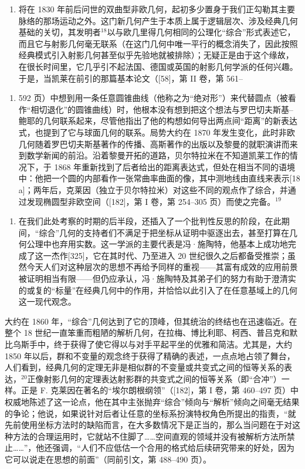 \begin{enumerate}
\item
  将在 1830 年前后问世的双曲型非欧几何，起初多少置身于我们正勾勒其主要脉络的那场运动之外。这门新几何产生于本质上属于逻辑层次、涉及经典几何基础的关切，其发明者\(^{18}\)以与欧几里得几何相同的公理化“综合”形式表述它，而且它与射影几何毫无联系（在这门几何中唯一平行的概念消失了，因此按照经典模式引入射影几何甚至似乎先验地就被排除）；无疑正是由于这个缘故，在很长时间里，它几乎引不起法国、德国或英国的射影几何学派的任何兴趣。于是，当凯莱在前引的那篇基本论文（{[}58{]}，第 II 卷，第 561–
\end{enumerate}

\begin{enumerate}
\def\labelenumi{\arabic{enumi})}
\setcounter{enumi}{591}
\tightlist
\item
  592 页）中想到用一条任意圆锥曲线（他称之为“绝对形”）来代替圆点（被看作“相切退化”的圆锥曲线）时，他根本没有想到把这个想法与罗巴切夫斯基–鲍耶的几何联系起来，尽管他指出了他的构想如何导出两点间“距离”的新表达式，也提到了它与球面几何的联系。局势大约在 1870 年发生变化，此时非欧几何随着罗巴切夫斯基著作的传播、高斯著作的出版以及黎曼的就职演讲而来到数学新闻的前沿。沿着黎曼开拓的道路，贝尔特拉米在不知道凯莱工作的情况下，于 1868 年重新找到了后者给出的距离表达式，但处在相当不同的语境中：他把一个圆的内部看作一张常曲率曲面的像，其中测地线由直线来表示{[}18 a{]}；两年后，克莱因（独立于贝尔特拉米）对这些不同的观点作了综合，并通过发现椭圆型非欧空间（{[}182{]}，第 I 卷，第 254–305 页）而使之完备。\(^{19}\)
\end{enumerate}

\begin{enumerate}
\def\labelenumi{\Alph{enumi})}
\setcounter{enumi}{6}
\tightlist
\item
  在我们此处考察的时期的后半段，还插入了一个批判性反思的阶段，在此期间，“综合”几何的支持者们不满足于把坐标从证明中驱逐出去，甚至打算在几何公理中也弃用实数。这一学派的主要代表是冯·施陶特，他基本上成功地完成了这一杰作{[}325{]}，它在其时代、乃至进入 20 世纪很久之后都备受推崇；虽然今天人们对这种层次的思想不再给予同样的重视——其富有成效的应用前景被证明相当有限——但仍应承认，冯·施陶特及其弟子们的努力有助于澄清实的或复的“标量”在经典几何中的作用，并恰恰以此引入了在任意基域上的几何这一现代观念。
\end{enumerate}

大约在 1860 年，“综合”几何达到了它的顶峰，但其统治的终结也在迅速临近。在整个 18 世纪一直笨重而粗陋的解析几何，在拉梅、博比利耶、柯西、普吕克和默比乌斯手中，终于获得了使它得以与对手平起平坐的优雅和简洁。尤其是，大约 1850 年以后，群和不变量的观念终于获得了精确的表述，一点点地占领了舞台，人们看到，经典几何的定理无非是相似群的不变量或共变式之间的恒等关系的表达，\(^{20}\)正像射影几何的定理表达射影群的共变式之间的恒等关系（即“合冲”）一样。正是 F. 克莱因在著名的“埃尔朗根纲领”（{[}182{]}，第 I 卷，第 460–497 页）中权威地陈述了这一论点，他在其中主张抛弃“综合”倾向与“解析”倾向之间毫无结果的争论；他说，如果说针对后者让任意的坐标系扮演特权角色所提出的指责，“就先前使用坐标方法时的缺陷而言，在大多数情况下是正当的，那么当问题在于对这种方法的合理运用时，它就站不住脚了……空间直观的领域并没有被解析方法所禁止……”，他还强调，“人们不应低估一个合用的格式给后续研究带来的好处，因为它可以说走在思想的前面”（同前引文，第 488–490 页）。

